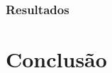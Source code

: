 \documentclass{report}
\begin{document}
\subsection{Resultados}




\chapter{Conclusão} \label{concl}
\end{document}
